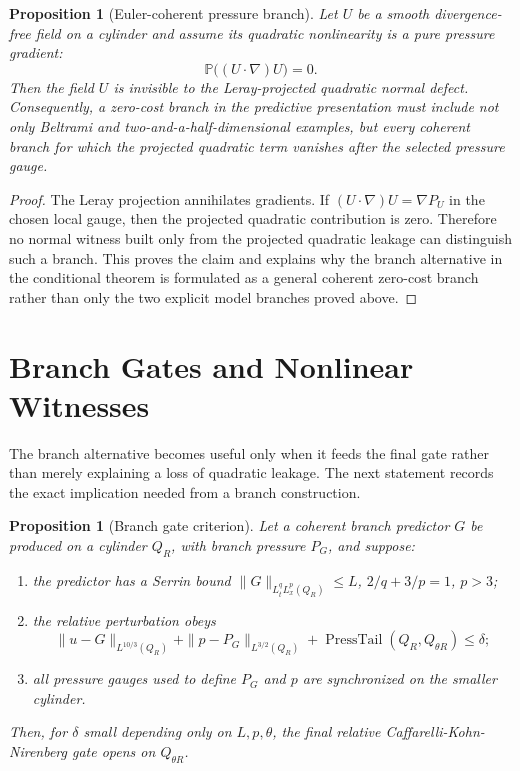\documentclass[11pt]{article}
\newtheorem{proposition}[theorem]{Proposition}
\begin{document}
\begin{proposition}[Euler-coherent pressure branch]
Let \(U\) be a smooth divergence-free field on a cylinder and assume its
quadratic nonlinearity is a pure pressure gradient:
\[
\mathbb P\bigl((U\cdot\nabla)U\bigr)=0.
\]
Then the field \(U\) is invisible to the Leray-projected quadratic normal defect.
Consequently, a zero-cost branch in the predictive presentation must include not
only Beltrami and two-and-a-half-dimensional examples, but every coherent branch
for which the projected quadratic term vanishes after the selected pressure
gauge.
\end{proposition}

\begin{proof}
The Leray projection annihilates gradients.  If
\((U\cdot\nabla)U=\nabla P_U\) in the chosen local gauge, then the projected
quadratic contribution is zero.  Therefore no normal witness built only from the
projected quadratic leakage can distinguish such a branch.  This proves the
claim and explains why the branch alternative in the conditional theorem is
formulated as a general coherent zero-cost branch rather than only the two
explicit model branches proved above.
\end{proof}

\section{Branch Gates and Nonlinear Witnesses}

The branch alternative becomes useful only when it feeds the final gate rather
than merely explaining a loss of quadratic leakage.  The next statement records
the exact implication needed from a branch construction.

\begin{proposition}[Branch gate criterion]
Let a coherent branch predictor \(G\) be produced on a cylinder \(Q_R\), with
branch pressure \(P_G\), and suppose:
\begin{enumerate}[label=(\roman*)]
\item the predictor has a Serrin bound
\(\|G\|_{L^q_tL^p_x(Q_R)}\le L\), \(2/q+3/p=1\), \(p>3\);
\item the relative perturbation obeys
\[
\|u-G\|_{L^{10/3}(Q_R)}
+
\|p-P_G\|_{L^{3/2}(Q_R)}
+
\operatorname{PressTail}(Q_R,Q_{\theta R})
\le\delta;
\]
\item all pressure gauges used to define \(P_G\) and \(p\) are synchronized on
the smaller cylinder.
\end{enumerate}
Then, for \(\delta\) small depending only on \(L,p,\theta\), the final relative
Caffarelli-Kohn-Nirenberg gate opens on \(Q_{\theta R}\).
\end{proposition}
\end{document}
